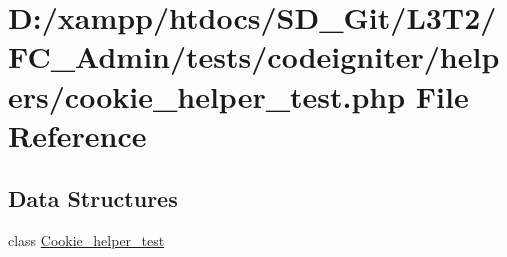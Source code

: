 \hypertarget{cookie__helper__test_8php}{}\section{D\+:/xampp/htdocs/\+S\+D\+\_\+\+Git/\+L3\+T2/\+F\+C\+\_\+\+Admin/tests/codeigniter/helpers/cookie\+\_\+helper\+\_\+test.php File Reference}
\label{cookie__helper__test_8php}
\subsection*{Data Structures}
\begin{DoxyCompactItemize}
\item 
class \hyperlink{class_cookie__helper__test}{Cookie\+\_\+helper\+\_\+test}
\end{DoxyCompactItemize}
